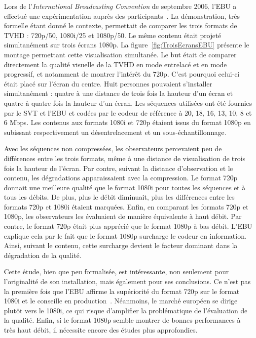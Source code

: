 Lors de l'\emph{International Broadcasting Convention} de septembre 2006, l'EBU a effectué une expérimentation auprès des participants~\cite{hoffmann-ibc2006}. La démonstration, très formelle étant donné le contexte, permettait de comparer les trois formats de TVHD : 720p/50, 1080i/25 et 1080p/50. Le même contenu était projeté simultanément sur trois écrans 1080p. La figure~\ref{fig:TroisEcransEBU} présente le montage permettant cette visualisation simultanée. Le but était de comparer directement la qualité visuelle de la TVHD en mode entrelacé et en mode progressif, et notamment de montrer l'intérêt du 720p. C'est pourquoi celui-ci était placé sur l'écran du centre. Huit personnes pouvaient s'installer simultanément : quatre à une distance de trois fois la hauteur d'un écran et quatre à quatre fois la hauteur d'un écran. Les séquences utilisées ont été fournies par le SVT et l'EBU et codées par le codeur de référence \avc{} à 20, 18, 16, 13, 10, 8 et 6 Mbps. Les contenus aux formats 1080i et 720p étaient issus du format 1080p en subissant respectivement un désentrelacement et un sous-échantillonnage.

Avec les séquences non compressées, les observateurs percevaient peu de différences entre les trois formats, même à une distance de visualisation de trois fois la hauteur de l'écran. Par contre, suivant la distance d'observation et le contenu, les dégradations apparaissaient avec la compression. Le format 720p donnait une meilleure qualité que le format 1080i pour toutes les séquences et à tous les débits. De plus, plus le débit diminuait, plus les différences entre les formats 720p et 1080i étaient marquées. Enfin, en comparant les formats 720p et 1080p, les observateurs les évaluaient de manière équivalente à haut débit. Par contre, le format 720p était plus apprécié que le format 1080p à bas débit. L'EBU explique cela par le fait que le format 1080p surcharge le codeur en information. Ainsi, suivant le contenu, cette surcharge devient le facteur dominant dans la dégradation de la qualité.

Cette étude, bien que peu formalisée, est intéressante, non seulement pour l'originalité de son installation, mais également pour ses conclusions. Ce n'est pas la première fois que l'EBU affirme la supériorité du format 720p sur le format 1080i et le conseille en production~\cite{wood-hd4u,laven-hdtvWars}. Néanmoins, le marché européen se dirige plutôt vers le 1080i, ce qui risque d'amplifier la problématique de l'évaluation de la qualité. Enfin, si le format 1080p semble montrer de bonnes performances à très haut débit, il nécessite encore des études plus approfondies.


